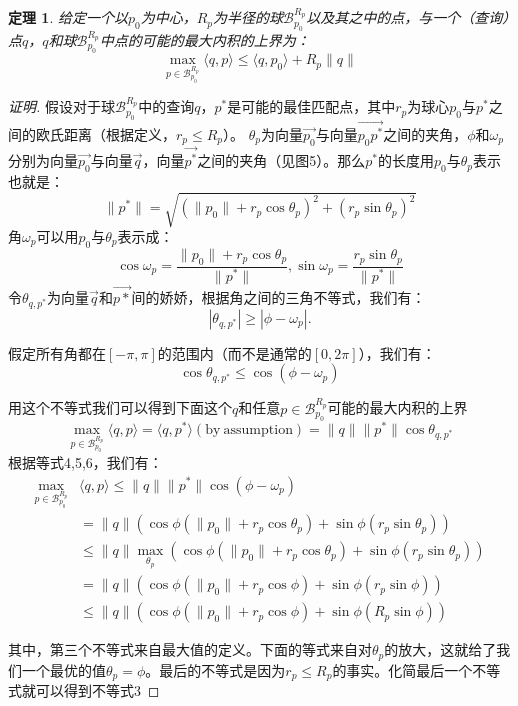 \documentclass[twocolumn,a4paper]{article}
\begin{document}
\newtheorem{theorem1}{定理}[section]
\begin{theorem1}
给定一个以$p_0$为中心，$R_p$为半径的球$\mathcal{B}_{p_0}^{R_p}$以及其之中的点，与一个（查询）点$q$，$q$和球$\mathcal{B}_{p_0}^{R_p}$中点的可能的最大内积的上界为：
\begin{equation}
\max_{p \in \mathcal{B}_{p_0}^{R_p}} \langle q,p \rangle \le \langle q,p_0 \rangle + R_p \|q\|
\end{equation}

\end{theorem1}
\begin{proof}[证明]
假设对于球$\mathcal{B}_{p_0}^{R_p}$中的查询$q$，$p^*$是可能的最佳匹配点，其中$r_p$为球心$p_0$与$p^*$之间的欧氏距离（根据定义，$r_p \le R_p$）。
$\theta_p$为向量$\vec{p_0}$与向量$\vec{p_0 p^*}$之间的夹角，$\phi$和$\omega_p$分别为向量$\vec{p_0}$与向量$\vec{q}$，向量$\vec{p^*}$之间的夹角（见图5）。那么$p^*$的长度用$p_0$与$\theta_p$表示也就是：
\begin{equation}
\|p^*\| = \sqrt{(\|p_0\| + r_p\cos\theta_p)^2+(r_p\sin\theta_p)^2}
\end{equation}
角$\omega_p$可以用$p_0$与$\theta_p$表示成：
\begin{equation}
\cos\omega_p = \frac{\|p_0\|+r_p\cos\theta_p}{\|p^*\|},
\sin\omega_p = \frac{r_p\sin\theta_p}{\|p^*\|}
\end{equation}
令$\theta_{q,p^*}$为向量$\vec{q}$和$\vec{p*}$间的娇娇，根据角之间的三角不等式，我们有：
\begin{equation*}
|\theta_{q,p^*}| \ge |\phi - \omega_p|.
\end{equation*}

假定所有角都在$[-\pi, \pi]$的范围内（而不是通常的$[0, 2\pi]$），我们有：
\begin{equation}
\cos\theta_{q,p^*} \le \cos(\phi - \omega_p)
\end{equation}

用这个不等式我们可以得到下面这个$q$和任意$p \in \mathcal{B}_{p_0}^{R_p}$可能的最大内积的上界
\begin{equation*}
\max_{p \in \mathcal{B}_{p_0}^{R_p}}\langle q,p \rangle = \langle q,p^* \rangle(\mathrm{by\ assumption}) = \|q\|\|p^*\|\cos\theta_{q,p^*}
\end{equation*}
根据等式4,5,6，我们有：
\begin{align*}
\max_{p \in \mathcal{B}_{p_0}^{R_p}}&\langle q,p \rangle \le \|q\|\|p^*\|\cos(\phi-\omega_p) \\
 &= \|q\|(\cos\phi(\|p_0\|+r_p\cos\theta_p)+\sin\phi(r_p\sin\theta_p))                       \\
 &\le\|q\|\max_{\theta_p}(\cos\phi(\|p_0\| + r_p\cos\theta_p)+\sin\phi(r_p\sin\theta_p))     \\
 &= \|q\|(\cos\phi(\|p_0\|+r_p\cos\phi)+\sin\phi(r_p\sin\phi))                               \\
 &\le \|q\|(\cos\phi(\|p_0\|+r_p\cos\phi)+\sin\phi(R_p\sin\phi))
\end{align*}

其中，第三个不等式来自最大值的定义。下面的等式来自对$\theta_p$的放大，这就给了我们一个最优的值$\theta_p = \phi$。最后的不等式是因为$r_p \le R_p$的事实。化简最后一个不等式就可以得到不等式3
\end{proof}
\end{document}
